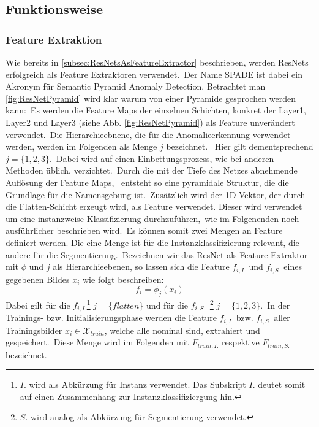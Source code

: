 \subsection{Funktionsweise}\label{subsec:SPADEFunktionsweise}
\subsubsection{Feature Extraktion}
Wie bereits in \ref{subsec:ResNetsAsFeatureExtractor} beschrieben, werden ResNets erfolgreich als Feature Extraktoren verwendet.\
Der Name \glqq SPADE\grqq{} ist dabei ein Akronym für \glqq Semantic Pyramid Anomaly Detection\grqq{}. Betrachtet man \ref{fig:ResNetPyramid} wird klar warum von einer \glqq Pyramide\grqq{} gesprochen werden kann:\
Es werden die Feature Maps der einzelnen Schichten, konkret der \glqq Layer1\grqq{}, \glqq Layer2\grqq{} und \glqq Layer3\grqq{} (siehe Abb. \ref{fig:ResNetPyramid}) als Feature unverändert verwendet.\
Die Hierarchieebnene, die für die Anomalieerkennung verwendet werden, werden im Folgenden als Menge $j$ bezeichnet. \
Hier gilt dementsprechend $j = \{1,2,3\}$.\
Dabei wird auf einen Einbettungsprozess, wie bei anderen Methoden üblich, verzichtet.\ 
Durch die mit der Tiefe des Netzes abnehmende Auflösung der Feature Maps, \
entsteht so eine pyramidale Struktur, die die Grundlage für die Namensgebung ist.\
Zusätzlich wird der 1D-Vektor, der durch die \glqq Flatten\grqq{}-Schicht erzeugt wird, als Feature verwendet. Dieser wird verwendet um eine instanzweise Klassifizierung durchzuführen,\
wie im Folgenenden noch ausführlicher beschrieben wird.\
Es können somit zwei Mengen an Feature definiert werden. Die eine Menge ist für die Instanzklassifizierung relevant, die andere für die Segmentierung.\
Bezeichnen wir das ResNet als Feature-Extraktor mit $\phi$ und $j$ als Hierarchieebenen, so lassen sich die Feature $f_{i, I.}$ und $f_{i, S.}$ eines gegebenen Bildes $x_{i}$ wie folgt beschreiben:
$$f_{i} = \phi_{j}(x_{i})$$
Dabei gilt für die $f_{i, I.}$\footnote{$I.$ wird als Abkürzung für \glqq Instanz\grqq{} verwendet. Das Subskript $I.$ deutet somit auf einen Zusammenhang zur Instanzklassifiziergung hin.} $j=\{flatten\}$ und für die $f_{i, S.}$\
\footnote{$S.$ wird analog als Abkürzung für \glqq Segmentierung\grqq{} verwendet.} $j=\{1,2,3\}$.\
In der Trainings- bzw. Initialisierungsphase werden die Feature $f_{i, I.}$ bzw. $f_{i, S.}$ aller Trainingsbilder $x_{i}\in\mathcal{X}_{train}$, welche alle nominal sind, extrahiert und gespeichert.\
Diese Menge wird im Folgenden mit $F_{train, I.}$ respektive $F_{train, S.}$ bezeichnet.\\
